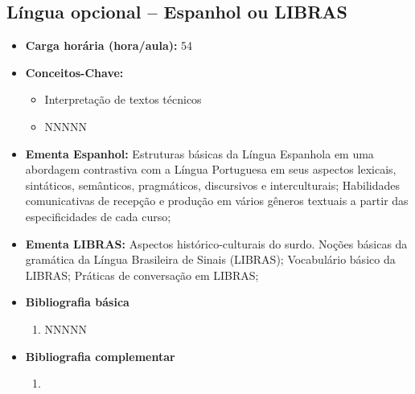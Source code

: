 \documentclass[11pt,fleqn]{book} %
\begin{document}
\subsection{Língua opcional – Espanhol ou LIBRAS}\label{disc:espanhol_libras}
\begin{itemize}
	\item \textbf{Carga horária (hora/aula):} 54
	\item \textbf{Conceitos-Chave:}
	\begin{itemize}
		\item Interpretação de textos técnicos
		\item NNNNN
	\end{itemize}
	\item \textbf{Ementa Espanhol:} 
	Estruturas básicas da Língua Espanhola em uma abordagem contrastiva com a Língua Portuguesa em seus aspectos lexicais, sintáticos, semânticos, pragmáticos, discursivos e interculturais; 
	Habilidades comunicativas de recepção e produção em vários gêneros textuais a partir das especificidades de cada curso;
	\item \textbf{Ementa LIBRAS:}
	Aspectos histórico-culturais do surdo. Noções básicas da gramática da Língua Brasileira de Sinais (LIBRAS);
	Vocabulário básico da LIBRAS;
	Práticas de conversação em LIBRAS;		
	\item \textbf{Bibliografia básica}
	\begin{enumerate}
		\item NNNNN
	\end{enumerate}
	\item \textbf{Bibliografia complementar}
	\begin{enumerate}
		\item 
	\end{enumerate}	
\end{itemize}

\newpage
\end{document}
